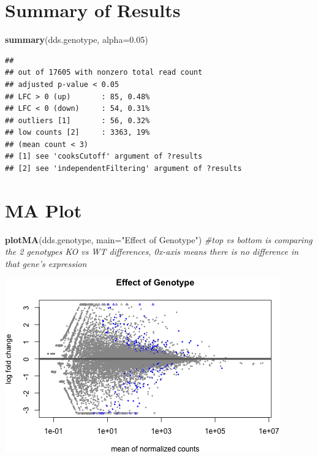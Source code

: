 \documentclass[]{article}
\newenvironment{Shaded}{\begin{snugshade}}{\end{snugshade}}
\newcommand{\CommentTok}[1]{\textcolor[rgb]{0.56,0.35,0.01}{\textit{#1}}}
\newcommand{\DataTypeTok}[1]{\textcolor[rgb]{0.13,0.29,0.53}{#1}}
\newcommand{\FloatTok}[1]{\textcolor[rgb]{0.00,0.00,0.81}{#1}}
\newcommand{\KeywordTok}[1]{\textcolor[rgb]{0.13,0.29,0.53}{\textbf{#1}}}
\newcommand{\NormalTok}[1]{#1}
\newcommand{\StringTok}[1]{\textcolor[rgb]{0.31,0.60,0.02}{#1}}
\begin{document}
\hypertarget{summary-of-results}{%
\section{Summary of Results}\label{summary-of-results}}

\begin{Shaded}
\begin{Highlighting}[]
\KeywordTok{summary}\NormalTok{(dds.genotype, }\DataTypeTok{alpha=}\FloatTok{0.05}\NormalTok{)}
\end{Highlighting}
\end{Shaded}

\begin{verbatim}
## 
## out of 17605 with nonzero total read count
## adjusted p-value < 0.05
## LFC > 0 (up)       : 85, 0.48%
## LFC < 0 (down)     : 54, 0.31%
## outliers [1]       : 56, 0.32%
## low counts [2]     : 3363, 19%
## (mean count < 3)
## [1] see 'cooksCutoff' argument of ?results
## [2] see 'independentFiltering' argument of ?results
\end{verbatim}

\hypertarget{ma-plot}{%
\section{MA Plot}\label{ma-plot}}

\begin{Shaded}
\begin{Highlighting}[]
\KeywordTok{plotMA}\NormalTok{(dds.genotype, }\DataTypeTok{main=}\StringTok{"Effect of Genotype"}\NormalTok{) }\CommentTok{#top vs bottom is comparing the 2 genotypes KO vs WT differences, 0x-axis means there is no difference in that gene's expression }
\end{Highlighting}
\end{Shaded}

\includegraphics{figures-noura/ma-plot-1.png}
\end{document}
